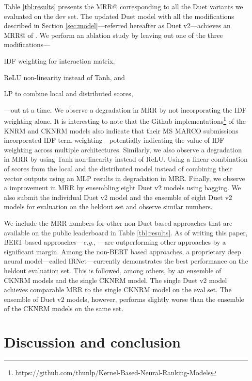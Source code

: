 \documentclass{article}
\newcommand{\eg}{\emph{e.g.}}
\begin{document}
Table \ref{tbl:results} presents the MRR@ corresponding to all the Duet variants we evaluated on the dev set.
The updated Duet model with all the modifications described in Section \ref{sec:model}---referred hereafter as Duet v2---achieves an MRR@ of .
We perform an ablation study by leaving out one of the three modifications---\begin{enumerate*}[label=(\roman*)]
    \item IDF weighting for interaction matrix, 
    \item ReLU non-linearity instead of Tanh, and
    \item LP to combine local and distributed scores,
\end{enumerate*}---out at a time.
We observe a  degradation in MRR by not incorporating the IDF weighting alone.
It is interesting to note that the Github implementations\footnote{
https://github.com/thunlp/Kernel-Based-Neural-Ranking-Models
} of the KNRM \citep{xiong2017end} and CKNRM \citep{dai2018convolutional} models also indicate that their MS MARCO submissions incorporated IDF term-weighting---potentially indicating the value of IDF weighting across multiple architectures.
Similarly, we also observe a  degradation in MRR by using Tanh non-linearity instead of ReLU.
Using a linear combination of scores from the local and the distributed model instead of combining their vector outputs using an MLP results in  degradation in MRR.
Finally, we observe a  improvement in MRR by ensembling eight Duet v2 models using bagging.
We also submit the individual Duet v2 model and the ensemble of eight Duet v2 models for evaluation on the heldout set and observe similar numbers.

We include the MRR numbers for other non-Duet based approaches that are available on the public leaderboard in Table \ref{tbl:results}.
As of writing this paper, BERT \citep{devlin2018bert} based approaches---\eg, \citep{nogueira2019passage}---are outperforming other approaches by a significant margin.
Among the non-BERT based approaches, a proprietary deep neural model---called IRNet---currently demonstrates the best performance on the heldout evaluation set.
This is followed, among others, by an ensemble of CKNRM \citep{dai2018convolutional} models and the single CKNRM model.
The single Duet v2 model achieves comparable MRR to the single CKNRM model on the eval set.
The ensemble of Duet v2 models, however, performs slightly worse than the ensemble of the CKNRM models on the same set. \section{Discussion and conclusion}
\label{sec:conclusion}
\end{document}

